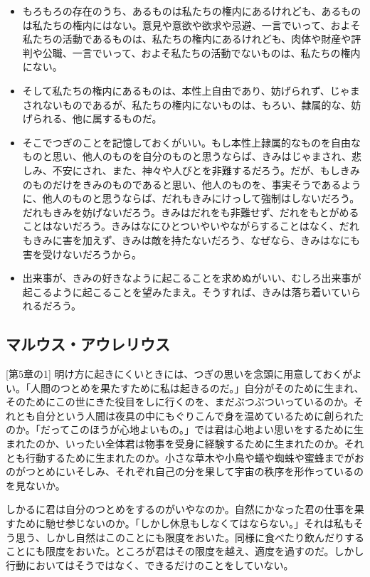 \documentclass[uplatex,dvipdfmx]{jsarticle} \usepackage{mystyle}%
\begin{document}
   \begin{itemize}
   \item もろもろの存在のうち、あるものは私たちの権内にあるけれども、あるものは私たちの権内にはない。意見や意欲や欲求や忌避、一言でいって、およそ私たちの活動であるものは、私たちの権内にあるけれども、肉体や財産や評判や公職、一言でいって、およそ私たちの活動でないものは、私たちの権内にない。

   \item そして私たちの権内にあるものは、本性上自由であり、妨げられず、じゃまされないものであるが、私たちの権内にないものは、もろい、隷属的な、妨げられる、他に属するものだ。


   \item そこでつぎのことを記憶しておくがいい。もし本性上隷属的なものを自由なものと思い、他人のものを自分のものと思うならば、きみはじゃまされ、悲しみ、不安にされ、また、神々や人びとを非難するだろう。だが、もしきみのものだけをきみのものであると思い、他人のものを、事実そうであるように、他人のものと思うならば、だれもきみにけっして強制はしないだろう。だれもきみを妨げないだろう。きみはだれをも非難せず、だれをもとがめることはないだろう。きみはなにひとついやいやながらすることはなく、だれもきみに害を加えず、きみは敵を持たないだろう、なぜなら、きみはなにも害を受けないだろうから。

   \item 出来事が、きみの好きなように起こることを求めぬがいい、むしろ出来事が起こるように起こることを望みたまえ。そうすれば、きみは落ち着いていられるだろう。
   \end{itemize}



\subsection*{マルウス・アウレリウス}



 [第5章の1] 明け方に起きにくいときには、つぎの思いを念頭に用意しておくがよい。「人間のつとめを果たすために私は起きるのだ。」自分がそのために生まれ、そのためにこの世にきた役目をしに行くのを、まだぶつぶついっているのか。それとも自分という人間は夜具の中にもぐりこんで身を温めているために創られたのか。「だってこのほうが心地よいもの。」では君は心地よい思いをするために生まれたのか、いったい全体君は物事を受身に経験するために生まれたのか。それとも行動するために生まれたのか。小さな草木や小鳥や蟻や蜘蛛や蜜蜂までがおのがつとめにいそしみ、それぞれ自己の分を果して宇宙の秩序を形作っているのを見ないか。

  しかるに君は自分のつとめをするのがいやなのか。自然にかなった君の仕事を果すために馳せ参じないのか。「しかし休息もしなくてはならない。」それは私もそう思う、しかし自然はこのことにも限度をおいた。同様に食べたり飲んだりすることにも限度をおいた。ところが君はその限度を越え、適度を過すのだ。しかし行動においてはそうではなく、できるだけのことをしていない。
\end{document}
